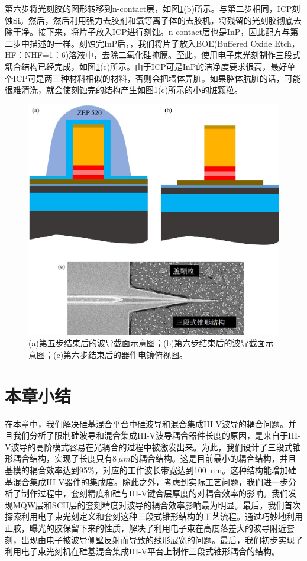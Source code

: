 第六步将光刻胶的图形转移到n-contact层，如图\ref{fig_ch3_step5_6}(b)所示。与第二步相同，ICP刻蚀Si。然后，然后利用强力去胶剂和氧等离子体的去胶机，将残留的光刻胶彻底去除干净。接下来，将片子放入ICP进行刻蚀。n-contact层也是InP，因此配方与第二步中描述的一样。刻蚀完InP后，，我们将片子放入BOE(Buffered Oxide Etch，HF：NHF=1：6)溶液中，去除二氧化硅掩膜。至此，使用电子束光刻制作三段式耦合结构已经完成，如图\ref{fig_ch3_step5_6}(c)所示。由于ICP可是InP的洁净度要求很高，最好单个ICP可是两三种材料相似的材料，否则会把墙体弄脏。如果腔体肮脏的话，可能很难清洗，就会使刻蚀完的结构产生如图\ref{fig_ch3_step5_6}(c)所示的小的脏颗粒。
\begin{figure}[htb]
	\centering
	\includegraphics[width=14cm]{./Pictures/fig_ch3_step5_6.jpg}
	\caption{(a)第五步结束后的波导截面示意图；(b)第六步结束后的波导截面示意图；(c)第六步结束后的器件电镜俯视图。}
	\label{fig_ch3_step5_6}
\end{figure}

\section{本章小结}
在本章中，我们解决硅基混合平台中硅波导和混合集成III-V波导的耦合问题。并且我们分析了限制硅波导和混合集成III-V波导耦合器件长度的原因，是来自于III-V波导的高阶模式容易在光耦合的过程中被激发出来。为此，我们设计了三段式锥形耦合结构，实现了长度只有$8 ~\mu m$的耦合结构。这是目前最小的耦合结构，并且基模的耦合效率达到95\%，对应的工作波长带宽达到100~nm。这种结构能增加硅基混合集成III-V器件的集成度。除此之外，考虑到实际工艺问题，我们进一步分析了制作过程中，套刻精度和硅与III-V键合层厚度的对耦合效率的影响。我们发现MQW层和SCH层的套刻精度对波导的耦合效率影响最为明显。最后，我们首次探索利用电子束光刻定义和套刻这种三段式锥形结构的工艺流程。通过巧妙地利用正胶，曝光的胶保留下来的性质，解决了利用电子束在高度落差大的波导附近套刻，出现由电子被波导侧壁反射而导致的线形展宽的问题。最后，我们初步实现了利用电子束光刻机在硅基混合集成III-V平台上制作三段式锥形耦合的结构。